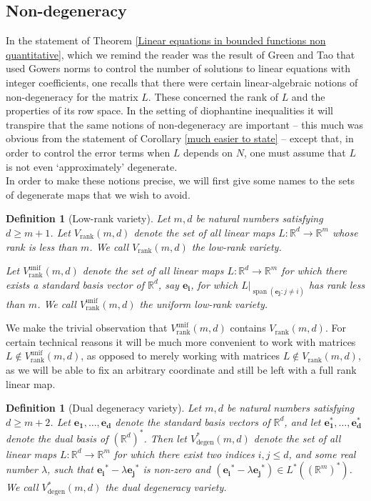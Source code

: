\documentclass[12pt,a4paper,twoside,reqno]{amsart}
\newtheorem{Definition}[Theorem]{Definition}
\newcommand{\degen}{\operatorname{degen}}
\newcommand{\rank}{\operatorname{rank}}
\newcommand{\unif}{\operatorname{unif}}
\newcommand{\spn}{\operatorname{span}}
\numberwithin{equation}{section}
\begin{document}
\subsection{Non-degeneracy}
\label{Section approximate degeneracy}
In the statement of Theorem \ref{Linear equations in bounded functions non quantitative}, which we remind the reader was the result of Green and Tao that used Gowers norms to control the number of solutions to linear equations with integer coefficients, one recalls that there were certain linear-algebraic notions of non-degeneracy for the matrix $L$. These concerned the rank of $L$ and the properties of its row space. In the setting of diophantine inequalities it will transpire that the same notions of non-degeneracy are important -- this much was obvious from the statement of Corollary \ref{much easier to state} -- except that, in order to control the error terms when $L$ depends on $N$, one must assume that $L$ is not even `approximately' degenerate. \\

In order to make these notions precise, we will first give some names to the sets of degenerate maps that we wish to avoid. 

\begin{Definition}[Low-rank variety]
\label{Definition rank variety}
Let $m,d$ be natural numbers satisfying $d\geqslant m+1$. Let $V_{\rank}(m,d)$ denote the set of all linear maps $L:\mathbb{R}^d \longrightarrow \mathbb{R}^m$ whose rank is less than $m$. We call $V_{\rank}(m,d)$ the \emph{low-rank variety}.

 Let $V_{ \rank}^{\unif}(m,d)$ denote the set of all linear maps $L:\mathbb{R}^d \longrightarrow \mathbb{R}^m$ for which there exists a standard basis vector of $\mathbb{R}^d$, say $\mathbf{e_i}$, for which $L|_{\spn(\mathbf{e_j}:j\neq i)}$ has rank less than $m$. We call $V_{ \rank}^{\unif}(m,d)$ the \emph{uniform low-rank variety}. 
\end{Definition}

\noindent We make the trivial observation that $V_{\rank}^{\unif}(m,d)$ contains $V_{\rank}(m,d)$. For certain technical reasons it will be much more convenient to work with matrices $L \notin V_{\rank}^{\unif}(m,d)$, as opposed to merely working with matrices $L \notin V_{\rank}(m,d)$, as we will be able to fix an arbitrary coordinate and still be left with a full rank linear map.


\begin{Definition}[Dual degeneracy variety]
\label{Definition dual degeneracy variety}
Let $m,d$ be natural numbers satisfying $d\geqslant m+2$. Let $\mathbf{e_1}, \dots,\mathbf{e_d}$ denote the standard basis vectors of $\mathbb{R}^d$, and let  $\mathbf{e_1^\ast}, \dots,\mathbf{e_d^\ast}$ denote the dual basis of $(\mathbb{R}^d)^\ast$. Then let $V^*_{\degen}(m,d)$ denote the set of all linear maps $L:\mathbb{R}^d \longrightarrow \mathbb{R}^m$  for which there exist two indices $i,j \leqslant d$, and some real number $\lambda$, such that $\mathbf{e_i}^* - \lambda \mathbf{e_j}^*$ is non-zero and $(\mathbf{e_i}^* - \lambda \mathbf{e_j}^*) \in L^*((\mathbb{R}^m)^*)$. We call $V^*_{\degen}(m,d)$ the \emph{dual degeneracy variety}. 
\end{Definition}
\end{document}
